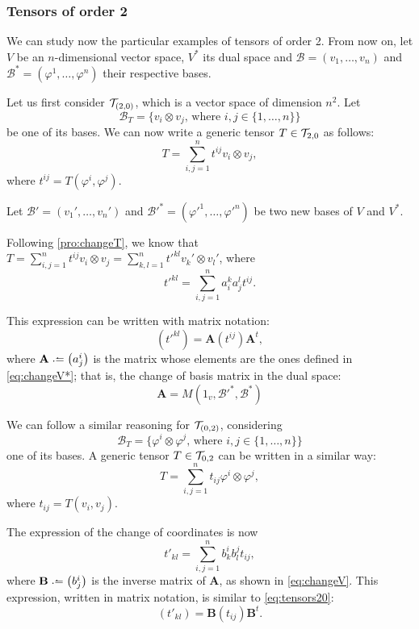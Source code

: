 \subsubsection*{Tensors of order 2}

We can study now the particular examples of tensors of order 2. From now on, let $V$ be an $n$-dimensional vector space, $V^*$ its dual space and $\mathcal{B} = (v_1, \dots, v_n)$ and $\mathcal{B^*} = (\varphi^1, \dots, \varphi^n)$ their respective bases.

Let us first consider ${\mathcal T}_{(2,0)}$, which is a vector space of dimension $n^2$. Let
\[
	\mathcal{B}_T = \{v_i \otimes v_j \textrm{, where } i,j \in \{1,\dots,n\}\}
\]
be one of its bases. We can now write a generic tensor $T\in{\mathcal T}_{2,0}$ as follows:
\[
	T = \sum_{i,j=1}^n t^{ij} v_i \otimes v_j,
\]
where $t^{ij} = T(\varphi^i, \varphi^j)$.

Let $\mathcal{B}' = (v_1', \dots, v_n')$ and $\mathcal{B}'^* = (\varphi'^1, \dots, \varphi'^n)$ be two new bases of $V$ and $V^*$.

Following \autoref{pro:changeT}, we know that $T = \sum_{i,j=1}^n t^{ij} v_i \otimes v_j = \sum_{k,l=1}^n t'^{kl} v_k' \otimes v_l'$, where
\[
	t'^{kl} = \sum_{i,j=1}^n a^k_i a^l_j t^{ij}.
\]

This expression can be written with matrix notation:
\begin{equation}
	\label{eq:tensors20}
	\left( t'^{kl} \right) = \mathbf{A} \left( t^{ij} \right) \mathbf{A}^t,
\end{equation}
where $\mathbf{A} \defeq \left(a_j^i\right)$ is the matrix whose elements are the ones defined in \autoref{eq:changeV*}; that is, the change of basis matrix in the dual space:
\[
	\mathbf{A} = M(1_v, \mathcal{B}'^*, \mathcal{B}^*)
\]

We can follow a similar reasoning for ${\mathcal T}_{(0,2)}$, considering
\[
\mathcal{B}_T = \{\varphi^i \otimes \varphi^j \textrm{, where } i,j \in \{1,\dots,n\}\}
\]
one of its bases. A generic tensor $T\in{\mathcal T}_{0,2}$ can be written in a similar way:
\[
T = \sum_{i,j=1}^n t_{ij} \varphi^i \otimes \varphi^j,
\]
where $t_{ij} = T(v_i, v_j)$.

The expression of the change of coordinates is now
\[
	t'_{kl} = \sum_{i,j=1}^n b_k^i b_l^j t_{ij},
\]
where $\mathbf{B} \defeq \left( b^i_j \right)$ is the inverse matrix of $\mathbf{A}$, as shown in \autoref{eq:changeV}. This expression, written in matrix notation, is similar to \autoref{eq:tensors20}:
\begin{equation}
	\label{eq:tensors02}
	\left( t'_{kl} \right) = \mathbf{B} \left( t_{ij} \right) \mathbf{B}^t.
\end{equation}

